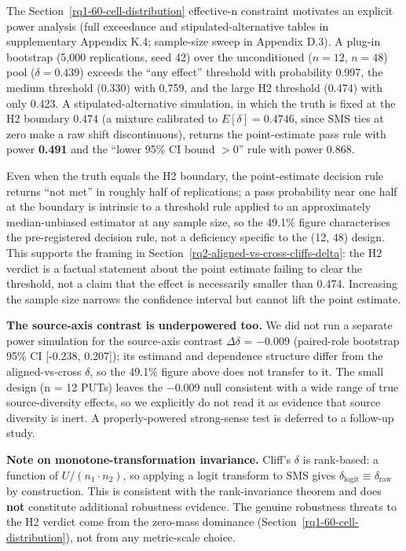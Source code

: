 \documentclass[manuscript,screen,review]{acmart}
\begin{document}
The Section~\ref{rq1-60-cell-distribution} effective-n constraint motivates an
explicit power analysis (full exceedance and stipulated-alternative tables in
supplementary Appendix K.4; sample-size sweep in Appendix D.3). A plug-in
bootstrap (5,000 replications, seed 42) over the unconditioned
($n=12$, $n=48$) pool ($\delta = 0.439$) exceeds the ``any effect''
threshold with probability 0.997, the medium threshold (0.330) with 0.759, and
the large H2 threshold (0.474) with only 0.423. A stipulated-alternative
simulation, in which the truth is fixed at the H2 boundary 0.474 (a mixture
calibrated to $E[\delta] = 0.4746$, since SMS ties at zero make a raw shift
discontinuous), returns the point-estimate pass rule with power \textbf{0.491}
and the ``lower 95\% CI bound $>0$'' rule with power 0.868.

Even when the truth equals the H2 boundary, the point-estimate decision rule
returns ``not met'' in roughly half of replications; a pass probability near
one half at the boundary is intrinsic to a threshold rule applied to an
approximately median-unbiased estimator at any sample size, so the 49.1\%
figure characterises the pre-registered decision rule, not a deficiency
specific to the (12, 48) design. This supports the framing in
Section~\ref{rq2-aligned-vs-cross-cliffs-delta}: the H2 verdict is a factual
statement about the point estimate failing to clear the threshold, not a claim
that the effect is necessarily smaller than 0.474. Increasing the sample size
narrows the confidence interval but cannot lift the point estimate.

\textbf{The source-axis contrast is underpowered too.} We did not run a
separate power simulation for the source-axis contrast $\Delta\delta$ =
$-$0.009 (paired-role bootstrap 95\% CI {[}-0.238, 0.207{]}); its estimand and dependence structure differ
from the aligned-vs-cross $\delta$, so the 49.1\% figure above does not
transfer to it. The small design (n = 12 PUTs) leaves the $-$0.009 null
consistent with a wide range of true source-diversity effects, so we
explicitly do not read it as evidence that source diversity is inert. A
properly-powered strong-sense test is deferred to a follow-up study.

\textbf{Note on monotone-transformation invariance.} Cliff's $\delta$ is
rank-based: a function of $U / (n_1 \cdot n_2)$, so applying a logit transform to
SMS gives $\delta_{\mathrm{logit}} \equiv \delta_{\mathrm{raw}}$ by construction. This is consistent with the
rank-invariance theorem and does \textbf{not} constitute additional
robustness evidence. The genuine robustness threats to the H2 verdict
come from the zero-mass dominance (Section~\ref{rq1-60-cell-distribution}), not from any metric-scale
choice.
\end{document}
